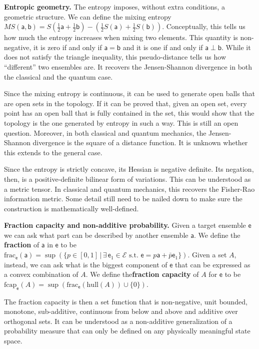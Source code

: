 \documentclass[10pt,twocolumn, nofootinbib]{revtex4-2}
\newcommand\fraction{\mathrm{frac}}
\newcommand\frcap{\mathrm{fcap}}
\newcommand{\ens}[1][e] {\mathsf{#1}} %
\newcommand{\Ens}[1][E] {\mathcal{#1}} %
\newcommand\hull{\mathrm{hull}}
\def\ortho{\perp}
\begin{document}
\textbf{Entropic geometry.} The entropy imposes, without extra conditions, a geometric structure. We can define the mixing entropy $MS(\ens[a], \ens[b]) = S\left(\frac{1}{2}\ens[a] + \frac{1}{2} \ens[b]\right) - \left(\frac{1}{2} S(\ens[a]) + \frac{1}{2} S(\ens[b])\right).$ Conceptually, this tells us how much the entropy increases when mixing two elements. This quantity is non-negative, it is zero if and only if $\ens[a] = \ens[b]$ and it is one if and only if $\ens[a] \ortho \ens[b]$. While it does not satisfy the triangle inequality, this pseudo-distance tells us how ``different'' two ensembles are. It recovers the Jensen-Shannon divergence in both the classical and the quantum case.

Since the mixing entropy is continuous, it can be used to generate open balls that are open sets in the topology. If it can be proved that, given an open set, every point has an open ball that is fully contained in the set, this would show that the topology is the one generated by entropy in such a way. This is still an open question. Moreover, in both classical and quantum mechanics, the Jensen-Shannon divergence is the square of a distance function. It is unknown whether this extends to the general case.

Since the entropy is strictly concave, its Hessian is negative definite. Its negation, then, is a positive-definite bilinear form of variations. This can be understood as a metric tensor. In classical and quantum mechanics, this recovers the Fisher-Rao information metric. Some detail still need to be nailed down to make sure the construction is mathematically well-defined.

\textbf{Fraction capacity and non-additive probability.} Given a target ensemble $\ens$ we can ask what part can be described by another ensemble $\ens[a]$. We define the \textbf{fraction} of $\ens[a]$ in $\ens$ to be $\fraction_{\ens}(\ens[a]) = \sup(\{ p \in [0,1] \, | \, \exists \, \ens_1 \in \Ens \text{ s.t. }  \ens = p \ens[a] + \bar{p} \ens_1 \})$. Given a set $A$, instead, we can ask what is the biggest component of $\ens$ that can be expressed as a convex combination of $A$. We define the\textbf{fraction capacity} of $A$ for $\ens$ to be $\frcap_{\ens}(A) = \sup(\fraction_{\ens}(\hull(A))\cup\{0\})$.

The fraction capacity is then a set function that is non-negative, unit bounded, monotone, sub-additive, continuous from below and above and additive over orthogonal sets. It can be understood as a non-additive generalization of a probability measure that can only be defined on any physically meaningful state space.
\end{document}
